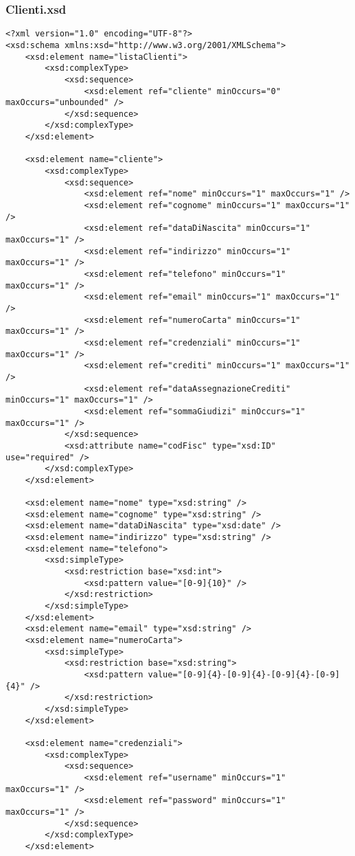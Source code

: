 \documentclass [a4paper, 12pt]{book}
\begin{document}
\subsubsection{Clienti.xsd}
\begin{lstlisting}[style=XML]
<?xml version="1.0" encoding="UTF-8"?>
<xsd:schema xmlns:xsd="http://www.w3.org/2001/XMLSchema">
    <xsd:element name="listaClienti">
        <xsd:complexType>
            <xsd:sequence>
                <xsd:element ref="cliente" minOccurs="0" maxOccurs="unbounded" />
            </xsd:sequence>
        </xsd:complexType>
    </xsd:element>

    <xsd:element name="cliente">
        <xsd:complexType>
            <xsd:sequence>
                <xsd:element ref="nome" minOccurs="1" maxOccurs="1" />
                <xsd:element ref="cognome" minOccurs="1" maxOccurs="1" />
                <xsd:element ref="dataDiNascita" minOccurs="1" maxOccurs="1" />
                <xsd:element ref="indirizzo" minOccurs="1" maxOccurs="1" />
                <xsd:element ref="telefono" minOccurs="1" maxOccurs="1" />
                <xsd:element ref="email" minOccurs="1" maxOccurs="1" />
                <xsd:element ref="numeroCarta" minOccurs="1" maxOccurs="1" />
                <xsd:element ref="credenziali" minOccurs="1" maxOccurs="1" />
                <xsd:element ref="crediti" minOccurs="1" maxOccurs="1" />
                <xsd:element ref="dataAssegnazioneCrediti" minOccurs="1" maxOccurs="1" />
                <xsd:element ref="sommaGiudizi" minOccurs="1" maxOccurs="1" />
            </xsd:sequence>
            <xsd:attribute name="codFisc" type="xsd:ID"  use="required" />
        </xsd:complexType>
    </xsd:element>

    <xsd:element name="nome" type="xsd:string" />
    <xsd:element name="cognome" type="xsd:string" />
    <xsd:element name="dataDiNascita" type="xsd:date" />
    <xsd:element name="indirizzo" type="xsd:string" />
    <xsd:element name="telefono">
        <xsd:simpleType>
            <xsd:restriction base="xsd:int">
                <xsd:pattern value="[0-9]{10}" />
            </xsd:restriction>
        </xsd:simpleType>
    </xsd:element>
    <xsd:element name="email" type="xsd:string" />
    <xsd:element name="numeroCarta">
        <xsd:simpleType>
            <xsd:restriction base="xsd:string">
                <xsd:pattern value="[0-9]{4}-[0-9]{4}-[0-9]{4}-[0-9]{4}" />
            </xsd:restriction>
        </xsd:simpleType>
    </xsd:element>

    <xsd:element name="credenziali">
        <xsd:complexType>
            <xsd:sequence>
                <xsd:element ref="username" minOccurs="1" maxOccurs="1" />
                <xsd:element ref="password" minOccurs="1" maxOccurs="1" />
            </xsd:sequence>
        </xsd:complexType>
    </xsd:element>


\end{lstlisting}
\end{document}
